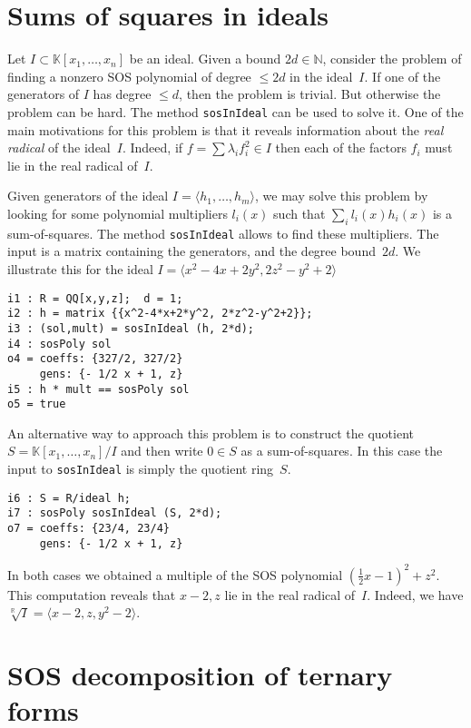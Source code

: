 \documentclass[11pt]{amsart}
\theoremstyle{plain}%
\theoremstyle{definition}
\theoremstyle{remark}
\newcommand{\NN}{\mathbb{N}}
\newcommand{\RR}{\mathbb{R}}
\newcommand{\kk}{\mathbb{K}}
\begin{document}
\section{Sums of squares in ideals}
Let $I \subset \kk[x_{1},\dots,x_{n}]$ be an ideal.  
Given a bound $2d\in\NN$, consider the problem of finding a nonzero SOS polynomial of degree $\leq \!2d$ in the ideal~$I$.
If one of the generators of $I$ has degree $\leq \!d$, then the problem is trivial.
But otherwise the problem can be hard.
The method \verb|sosInIdeal| can be used to solve it.
One of the main motivations for this problem is that it reveals information about the \emph{real radical} of the ideal~$I$.
Indeed, if $f = \sum \lambda_i f_i^2 \in I$ then each of the factors $f_i$ must lie in the real radical of~$I$.

Given generators of the ideal $I=\langle h_1,\dots,h_m\rangle$, we may solve this problem by looking for some polynomial multipliers $l_i(x)$ such that  $\sum_i l_i(x) h_i(x)$ is a sum-of-squares.
The method \verb|sosInIdeal| allows to find these multipliers.
The input is a matrix containing the generators, and the degree bound~$2d$.
We illustrate this for the ideal 
$I=\langle x^2{-}4 x{+}2 y^2, 2 z^2{-}y^2{+}2 \rangle$
{\small
\begin{verbatim}
i1 : R = QQ[x,y,z];  d = 1;
i2 : h = matrix {{x^2-4*x+2*y^2, 2*z^2-y^2+2}};
i3 : (sol,mult) = sosInIdeal (h, 2*d);
i4 : sosPoly sol
o4 = coeffs: {327/2, 327/2}
     gens: {- 1/2 x + 1, z}
i5 : h * mult == sosPoly sol
o5 = true
\end{verbatim}
}
\noindent
An alternative way to approach this problem is to construct the quotient $S = \kk[x_{1},\dots,x_{n}]/I$ and then write $0\in S$ as a sum-of-squares.
In this case the input to \verb|sosInIdeal| is simply the quotient ring~$S$.
{\small
\begin{verbatim}
i6 : S = R/ideal h;
i7 : sosPoly sosInIdeal (S, 2*d);
o7 = coeffs: {23/4, 23/4}
     gens: {- 1/2 x + 1, z}
\end{verbatim}
}
\noindent
In both cases we obtained a multiple of the SOS polynomial $(\frac{1}{2}x{-}1)^2{+}z^2$.
This computation reveals that $x{-}2,z$ lie in the real radical of~$I$.
Indeed, we have $\sqrt[\RR]{I} = \langle x{-}2,z,y^2{-}2\rangle$.

\section{SOS decomposition of ternary forms}
\end{document}
